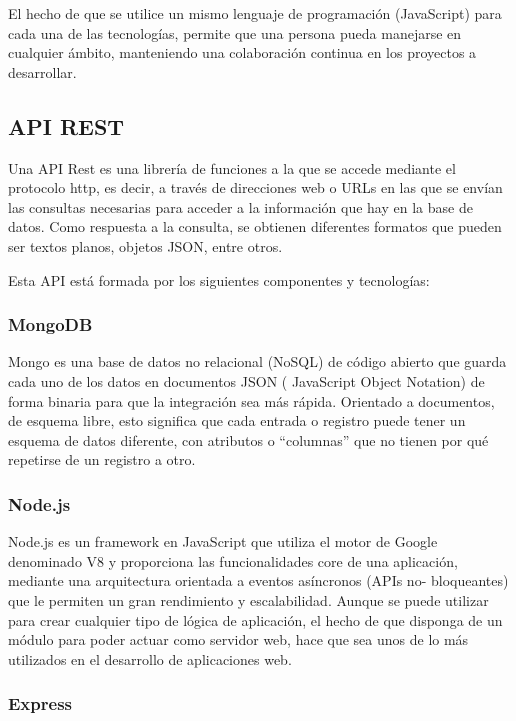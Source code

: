\pagebreak
El hecho de que se utilice un mismo lenguaje de programación (JavaScript) para
cada una de las tecnologías, permite que una persona pueda manejarse en
cualquier ámbito, manteniendo una colaboración continua en los proyectos a
desarrollar.

\subsection{API REST}

Una API Rest es una librería de funciones a la que se accede mediante el
protocolo http, es decir, a través de direcciones web o URLs en las que se envían
las consultas necesarias para acceder a la información que hay en la base de
datos. Como respuesta a la consulta, se obtienen diferentes formatos que
pueden ser textos planos, objetos JSON, entre otros.

Esta API está formada por los siguientes componentes y tecnologías:

\subsubsection{MongoDB}

Mongo es una base de datos no relacional (NoSQL) de código abierto que
guarda cada uno de los datos en documentos JSON ( JavaScript Object
Notation) de forma binaria para que la integración sea más rápida. 
Orientado a documentos, de esquema libre, esto significa que cada entrada o registro puede tener un esquema de datos diferente, con atributos o “columnas” que no tienen por qué repetirse de un registro a otro.

\subsubsection{Node.js}

Node.js es un framework en JavaScript que utiliza el motor de Google
denominado V8 y proporciona las funcionalidades core de una aplicación,
mediante una arquitectura orientada a eventos asíncronos (APIs no-
bloqueantes) que le permiten un gran rendimiento y escalabilidad.
Aunque se puede utilizar para crear cualquier tipo de lógica de aplicación, el
hecho de que disponga de un módulo para poder actuar como servidor web,
hace que sea unos de lo más utilizados en el desarrollo de aplicaciones web.

\subsubsection{Express}

